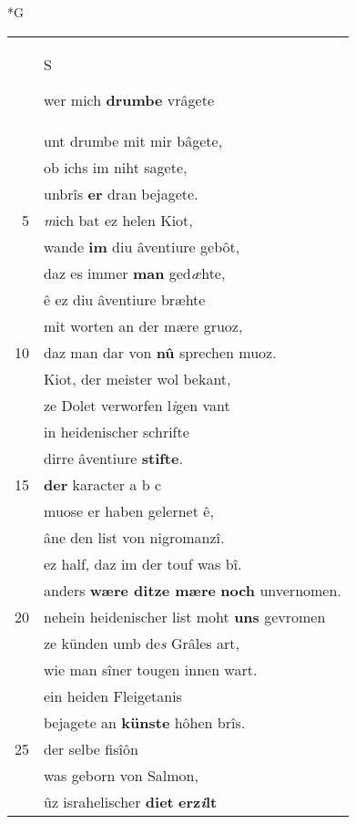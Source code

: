 \documentclass[8pt,a4paper,notitlepage]{article}
\begin{document}
\begin{table}[ht]
\begin{minipage}[t]{0.5\linewidth}
\end{minipage}
\end{table}
\newpage
\begin{table}[ht]
\begin{minipage}[t]{0.5\linewidth}
\small
\begin{center}*G
\end{center}
\begin{tabular}{rl}
 & \begin{large}S\end{large}wer mich \textbf{drumbe} vrâgete\\ 
 & unt drumbe mit mir bâgete,\\ 
 & ob ichs im niht sagete,\\ 
 & unbrîs \textbf{er} dran bejagete.\\ 
5 & \textit{m}ich bat ez helen Kiot,\\ 
 & wande \textbf{im} diu âventiure gebôt,\\ 
 & daz es immer \textbf{man} ged\textit{æ}hte,\\ 
 & ê ez diu âventiure bræhte\\ 
 & mit worten an der mære gruoz,\\ 
10 & daz man dar von \textbf{nû} sprechen muoz.\\ 
 & Kiot, der meister wol bekant,\\ 
 & ze Dolet verworfen l\textit{i}gen vant\\ 
 & in heidenischer schrifte\\ 
 & dirre âventiure \textbf{stifte}.\\ 
15 & \textbf{der} karacter a b c\\ 
 & muose er haben gelernet ê,\\ 
 & âne den list von nigromanzî.\\ 
 & ez half, daz im der touf was bî.\\ 
 & anders \textbf{wære ditze mære} \textbf{noch} unvernomen.\\ 
20 & nehein heidenischer list moht \textbf{uns} gevromen\\ 
 & ze künden umb de\textit{s} Grâles art,\\ 
 & wie man sîner tougen innen wart.\\ 
 & ein heiden Fleigetanis\\ 
 & bejagete an \textbf{künste} hôhen brîs.\\ 
25 & der selbe fisîôn\\ 
 & was geborn von Salmon,\\ 
 & ûz israhelischer \textbf{diet} \textbf{erz\textit{i}lt}\\ 

\end{tabular}
\end{minipage}
\end{table}
\end{document}
